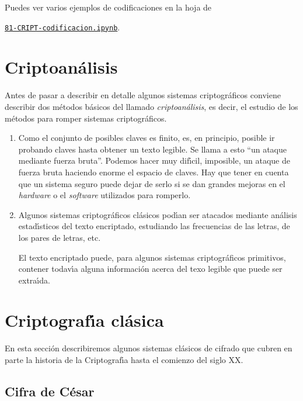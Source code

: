 Puedes ver varios ejemplos de codificaciones en la hoja de {\sage}
\begin{center}
\href{http://localhost:8888/notebooks/CRIPT/81-CRIPT-codificacion.ipynb}{\tt 81-CRIPT-codificacion.ipynb}.
\end{center}
\section{Criptoan\'alisis}

Antes de pasar a describir en detalle algunos sistemas criptogr\'aficos conviene
describir dos m\'etodos b\'asicos del llamado {\it criptoan\'alisis}, es decir,
el estudio de los m\'etodos para romper sistemas criptogr\'aficos.

\begin{enumerate}
 \item Como el conjunto de posibles claves es finito, es, en principio,  posible
ir probando claves hasta obtener un texto legible. Se llama a esto ``un ataque
mediante fuerza bruta''. Podemos hacer  muy dif\'{\i}cil, imposible, un ataque
de fuerza bruta haciendo enorme el espacio de claves. 
Hay que tener en cuenta
que un sistema seguro puede dejar de serlo si se dan grandes mejoras en el
{\itshape hardware} o el {\itshape software} utilizados para romperlo.
 
 \item Algunos sistemas criptogr\'aficos cl\'asicos pod\'{\i}an ser atacados
mediante
an\'alisis estad\'{\i}sticos del texto encriptado, estudiando las frecuencias de
las letras, de los pares de letras, etc.

El texto encriptado puede, para algunos sistemas criptogr\'aficos primitivos,
contener todav\'{\i}a alguna informaci\'on acerca del texo legible que puede
ser extra\'{\i}da.
\end{enumerate}

\section{Criptograf\'{\i}a cl\'asica}

En esta secci\'on describiremos algunos sistemas cl\'asicos de cifrado que
cubren en parte la historia de la Criptograf\'{\i}a hasta el comienzo del siglo
XX.


\subsection{Cifra de C\'esar}


